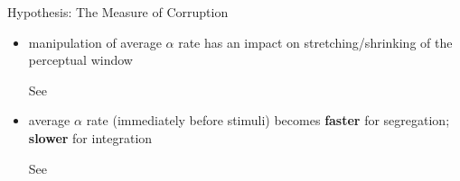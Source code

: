 \begin{frame}{{Hypothesis:} The Measure of Corruption}
{\begin{itemize}
            {\scriptsize See \citet{samaha2015speed,buergers2022role}}
            \item<11-> manipulation of average $\alpha$ rate has an impact on stretching/shrinking of the perceptual window
            
            {\scriptsize See \citet{cecere2015individual,minami2017illusory,ronconi2018alpha,mioni2020modulation}}
            \item<12-> average $\alpha$ rate (immediately before stimuli) becomes \textcolor{lightlavender}{\textbf{faster}} for segregation;  \textcolor{lightlavender}{\textbf{slower}} for integration
            
            {\scriptsize See \citet{wutz2018frequency}}
        \end{itemize}
    }

        
    \end{frame}


